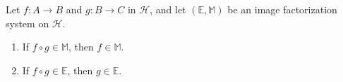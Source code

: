 Let $f: A \longrightarrow B$ and $g: B \longrightarrow C$ in $\mathcal{H}$, and let $(\mathbb{E}, \mathbb{M})$ be an image factorization system on $\mathcal{H}$.

\begin{enumerate}
  \item If $f \circ g \in \mathbb{M}$, then $f \in \mathbb{M}$.
  \item If $f \circ g \in \mathbb{E}$, then $g \in \mathbb{E}$.
\end{enumerate}
